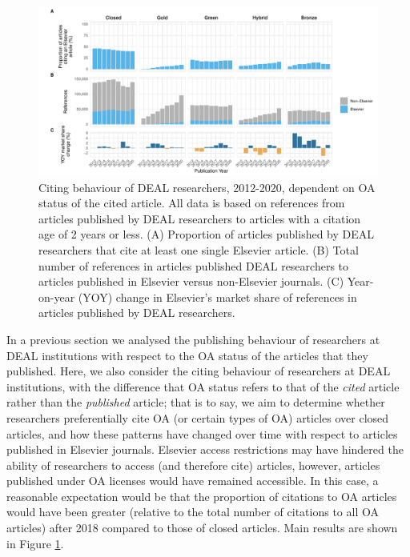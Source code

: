 \documentclass[
]{article}
\begin{document}
\begin{figure}
\centering
\includegraphics{analysis_files/figure-latex/references-publisher-year-oa-1.pdf}
\caption{\label{fig:references-publisher-year-oa}Citing behaviour of DEAL researchers, 2012-2020, dependent on OA status of the cited article. All data is based on references from articles published by DEAL researchers to articles with a citation age of 2 years or less. (A) Proportion of articles published by DEAL researchers that cite at least one single Elsevier article. (B) Total number of references in articles published DEAL researchers to articles published in Elsevier versus non-Elsevier journals. (C) Year-on-year (YOY) change in Elsevier's market share of references in articles published by DEAL researchers.}
\end{figure}

In a previous section we analysed the publishing behaviour of researchers at DEAL institutions with respect to the OA status of the articles that they published. Here, we also consider the citing behaviour of researchers at DEAL institutions, with the difference that OA status refers to that of the \emph{cited} article rather than the \emph{published} article; that is to say, we aim to determine whether researchers preferentially cite OA (or certain types of OA) articles over closed articles, and how these patterns have changed over time with respect to articles published in Elsevier journals. Elsevier access restrictions may have hindered the ability of researchers to access (and therefore cite) articles, however, articles published under OA licenses would have remained accessible. In this case, a reasonable expectation would be that the proportion of citations to OA articles would have been greater (relative to the total number of citations to all OA articles) after 2018 compared to those of closed articles. Main results are shown in Figure \ref{fig:references-publisher-year-oa}.
\end{document}
